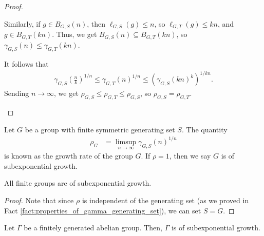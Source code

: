 \begin{proof}
\begin{enumerate}[(1)]
      Similarly, if $g\in B_{G,S}\left(n\right)$, then $\ell_{G,S}\left(g\right)\leq n$, so $\ell_{G,T}\left(g\right) \leq kn$, and $g\in B_{G,T}\left(kn\right)$. Thus, we get $B_{G,S}\left(n\right)\subseteq B_{G,T}\left(kn\right)$, so $\gamma_{G,S}\left(n\right)\leq \gamma_{G,T}\left(kn\right)$.\newline

      It follows that
      \begin{align*}
        \gamma_{G,S}\left(\frac{n}{k}\right)^{1/n} \leq \gamma_{G,T}\left(n\right)^{1/n} \leq \left(\gamma_{G,S}\left(kn\right)^{k}\right)^{1/kn}.
      \end{align*}
      Sending $n\rightarrow\infty$, we get $\rho_{G,S}\leq \rho_{G,T}\leq \rho_{G,S}$, so $\rho_{G,S} = \rho_{G,T}$.
  \end{enumerate}
\end{proof}
\begin{definition}
  Let $G$ be a group with finite symmetric generating set $S$. The quantity
  \begin{align*}
    \rho_{G} &= \limsup_{n\rightarrow\infty}\gamma_{G,S}\left(n\right)^{1/n}
  \end{align*}
  is known as the growth rate of the group $G$. If $\rho = 1$, then we say $G$ is of subexponential growth.
\end{definition}
\begin{fact}\label{fact:finite_groups_subexponential_growth}
  All finite groups are of subexponential growth.
\end{fact}
\begin{proof}
Note that since $\rho$ is independent of the generating set (as we proved in Fact \ref{fact:properties_of_gamma_generating_set}), we can set $S = G$.
\end{proof}
\begin{fact}\label{fact:finitely_generated_abelian_groups_subexponential_growth}
  Let $\Gamma$ be a finitely generated abelian group. Then, $\Gamma$ is of subexponential growth.
\end{fact}

